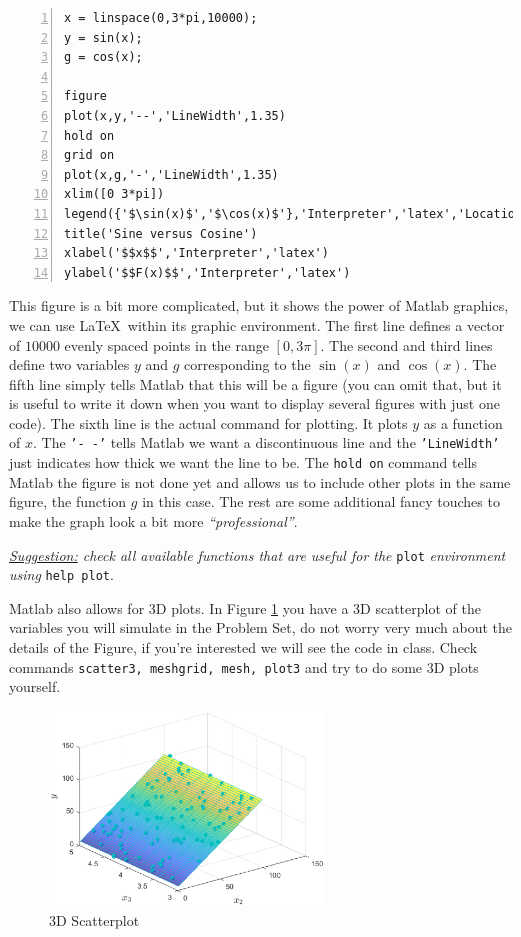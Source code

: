 \documentclass[a4paper,11pt]{article}
\begin{document}
\begin{Verbatim}[numbers=left]
x = linspace(0,3*pi,10000);
y = sin(x);
g = cos(x);

figure
plot(x,y,'--','LineWidth',1.35)
hold on
grid on
plot(x,g,'-','LineWidth',1.35)
xlim([0 3*pi])
legend({'$\sin(x)$','$\cos(x)$'},'Interpreter','latex','Location','best')
title('Sine versus Cosine')
xlabel('$$x$$','Interpreter','latex')
ylabel('$$F(x)$$','Interpreter','latex')
\end{Verbatim}

This figure is a bit more complicated, but it shows the power of Matlab graphics, we can use \LaTeX\ within its graphic environment. The first line defines a vector of $10000$ evenly spaced points in the range $[0,3\pi]$. The second and third lines define two variables $y$ and $g$ corresponding to the $\sin(x)$ and $\cos(x)$. The fifth line simply tells Matlab that this will be a figure (you can omit that, but it is useful to write it down when you want to display several figures with just one code). The sixth line is the actual command for plotting. It plots $y$ as a function of $x$. The \texttt{'- -'} tells Matlab we want a discontinuous line and the \texttt{'LineWidth'} just indicates how thick we want the line to be. The \texttt{hold on} command tells Matlab the figure is not done yet and allows us to include other plots in the same figure, the function $g$ in this case. The rest are some additional fancy touches to make the graph look a bit more \textit{``professional''}.

\textit{\underline{Suggestion:} check all available functions that are useful for the } \texttt{plot} \textit{environment using} \texttt{help plot}.

Matlab also allows for 3D plots. In Figure \ref{3dscatter} you have a 3D scatterplot of the variables you will simulate in the Problem Set, do not worry very much about the details of the Figure, if you're interested we will see the code in class. Check commands \texttt{scatter3, meshgrid, mesh, plot3} and try to do some 3D plots yourself.

\begin{figure}
\centering
	\includegraphics[width = 0.65\textwidth]{3dscatter.eps}
	\caption{3D Scatterplot}
	\label{3dscatter}
\end{figure}
\end{document}
